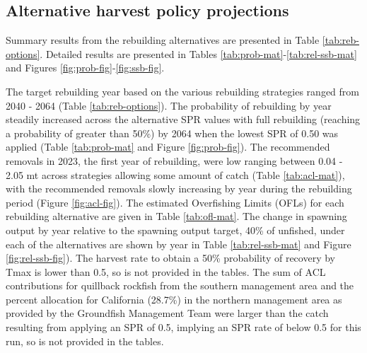\documentclass[11pt,
  english,
  a4paper,
]{article}
\begin{document}

\hypertarget{alternative-harvest-policy-projections}{%
\subsection{Alternative harvest policy projections}\label{alternative-harvest-policy-projections}}

\leavevmode\tagmcend\tagstructend


Summary results from the rebuilding alternatives are presented in Table \ref{tab:reb-options}. Detailed results are presented in Tables \ref{tab:prob-mat}-\ref{tab:rel-ssb-mat} and Figures \ref{fig:prob-fig}-\ref{fig:ssb-fig}.

\leavevmode\tagmcend\tagstructend\par


The target rebuilding year based on the various rebuilding strategies ranged from 2040 - 2064 (Table \ref{tab:reb-options}). The probability of rebuilding by year steadily increased across the alternative SPR values with full rebuilding (reaching a probability of greater than 50\%) by 2064 when the lowest SPR of 0.50 was applied (Table \ref{tab:prob-mat} and Figure \ref{fig:prob-fig}). The recommended removals in 2023, the first year of rebuilding, were low ranging between 0.04 - 2.05 mt across strategies allowing some amount of catch (Table \ref{tab:acl-mat}), with the recommended removals slowly increasing by year during the rebuilding period (Figure \ref{fig:acl-fig}). The estimated Overfishing Limits (OFLs) for each rebuilding alternative are given in Table \ref{tab:ofl-mat}. The change in spawning output by year relative to the spawning output target, 40\% of unfished, under each of the alternatives are shown by year in Table \ref{tab:rel-ssb-mat} and Figure \ref{fig:rel-ssb-fig}). The harvest rate to obtain a 50\% probability of recovery by Tmax is lower than 0.5, so is not provided in the tables. The sum of ACL contributions for quillback rockfish from the southern management area and the percent allocation for California (28.7\%) in the northern management area as provided by the Groundfish Management Team were larger than the catch resulting from applying an SPR of 0.5, implying an SPR rate of below 0.5 for this run, so is not provided in the tables.

\leavevmode\tagmcend\tagstructend\par
\end{document}
